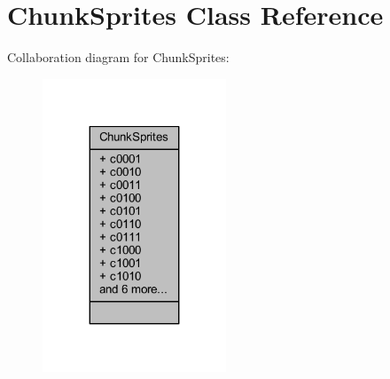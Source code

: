 \hypertarget{class_chunk_sprites}{}\section{Chunk\+Sprites Class Reference}
\label{class_chunk_sprites}


Collaboration diagram for Chunk\+Sprites\+:
\nopagebreak
\begin{figure}[H]
\begin{center}
\leavevmode
\includegraphics[width=155pt]{class_chunk_sprites__coll__graph}
\end{center}
\end{figure}
